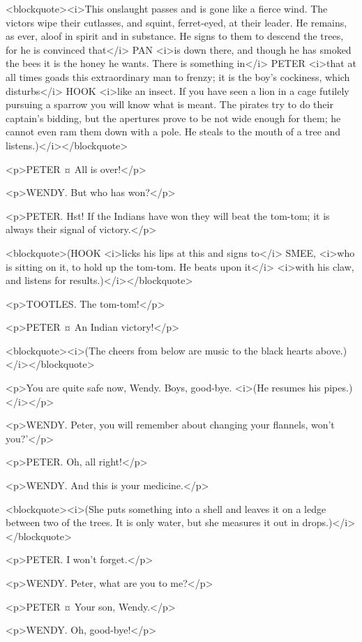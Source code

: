 <blockquote><i>This onslaught passes and is gone like a fierce wind. The victors wipe their cutlasses, and squint, ferret-eyed, at their leader. He remains, as ever, aloof in spirit and in substance. He signs to them to descend the trees, for he is convinced that</i> PAN <i>is down there, and though he has smoked the bees it is the honey he wants. There is something in</i> PETER <i>that at all times goads this extraordinary man to frenzy; it is the boy's cockiness, which disturbs</i> HOOK <i>like an insect. If you have seen a lion in a cage futilely pursuing a sparrow you will know what is meant. The pirates try to do their captain's bidding, but the apertures prove to be not wide enough for them; he cannot even ram them down with a pole. He steals to the mouth of a tree and listens.)</i></blockquote>

<p>PETER ¤
All is over!</p>

<p>WENDY. But who has won?</p>

<p>PETER. Hst! If the Indians have won they will beat the tom-tom; it is always their signal of victory.</p>

<blockquote>(HOOK <i>licks his lips at this and signs to</i> SMEE, <i>who is sitting on it, to hold up the tom-tom. He beats upon it</i> <i>with his claw, and listens for results.)</i></blockquote>

<p>TOOTLES. The tom-tom!</p>

<p>PETER ¤
An Indian victory!</p>

<blockquote><i>(The cheers from below are music to the black hearts above.)</i></blockquote>

<p>You are quite safe now, Wendy. Boys, good-bye. <i>(He resumes his pipes.)</i></p>

<p>WENDY. Peter, you will remember about changing your flannels, won't you?'</p>

<p>PETER. Oh, all right!</p>

<p>WENDY. And this is your medicine.</p>

<blockquote><i>(She puts something into a shell and leaves it on a ledge between two of the trees. It is only water, but she measures it out in drops.)</i></blockquote>

<p>PETER. I won't forget.</p>

<p>WENDY. Peter, what are you to me?</p>

<p>PETER ¤
Your son, Wendy.</p>

<p>WENDY. Oh, good-bye!</p>

